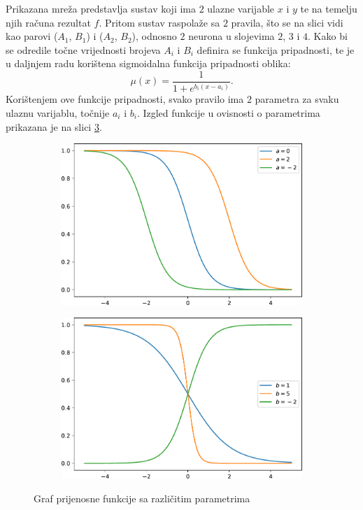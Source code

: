 \documentclass[12pt, a4paper, numeric]{article}
\begin{document}
Prikazana mreža predstavlja sustav koji ima $2$ ulazne varijable $x$ i $y$ te na temelju njih računa rezultat $f$.
Pritom sustav raspolaže sa $2$ pravila, što se na slici vidi kao parovi ($A_1$, $B_1$) i ($A_2$, $B_2$), odnosno $2$ neurona u slojevima $2$, $3$ i $4$.
Kako bi se odredile točne vrijednosti brojeva $A_i$ i $B_i$ definira se funkcija pripadnosti, te je u daljnjem radu korištena sigmoidalna funkcija pripadnosti oblika:
\[
\mu(x) = \frac{1}{1 + e^{b_i(x-a_i)}}.
\]
Korištenjem ove funkcije pripadnosti, svako pravilo ima $2$ parametra za svaku ulaznu varijablu, točnije $a_i$ i $b_i$.
Izgled funkcije u ovisnosti o parametrima prikazana je na slici \ref{fig:sigmoida}.
\begin{figure}[th!]
    \centering
    \begin{subfigure}{.5\textwidth}
        \centering
        \includegraphics[width=.85\linewidth]{img/sigmoida_a}
        \captionsetup{justification=centering}
        \caption{}
        \label{fig:sigmoida_a}
    \end{subfigure}%
    \begin{subfigure}{.5\textwidth}
        \centering
        \includegraphics[width=.85\linewidth]{img/sigmoida_b}
        \captionsetup{justification=centering}
        \caption{}
        \label{fig:sigmoida_b}
    \end{subfigure}
    \caption{Graf prijenosne funkcije sa različitim parametrima}
    \label{fig:sigmoida}
\end{figure}
\end{document}

